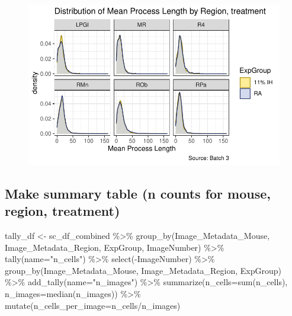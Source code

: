\documentclass[
  12pt,
  letterpaper,
  DIV=11,
  numbers=noendperiod]{scrartcl}
\newenvironment{Shaded}{\begin{snugshade}}{\end{snugshade}}
\newcommand{\AttributeTok}[1]{\textcolor[rgb]{0.40,0.45,0.13}{#1}}
\newcommand{\FunctionTok}[1]{\textcolor[rgb]{0.28,0.35,0.67}{#1}}
\newcommand{\NormalTok}[1]{\textcolor[rgb]{0.00,0.23,0.31}{#1}}
\newcommand{\OtherTok}[1]{\textcolor[rgb]{0.00,0.23,0.31}{#1}}
\newcommand{\SpecialCharTok}[1]{\textcolor[rgb]{0.37,0.37,0.37}{#1}}
\newcommand{\StringTok}[1]{\textcolor[rgb]{0.13,0.47,0.30}{#1}}
\begin{document}
\begin{figure}[H]

{\centering \includegraphics{Fiber_analysis_quarto_files/figure-pdf/make_distribution_plots_region-5.pdf}

}

\end{figure}

\hypertarget{make-summary-table-n-counts-for-mouse-region-treatment}{%
\subsection{Make summary table (n counts for mouse, region,
treatment)}\label{make-summary-table-n-counts-for-mouse-region-treatment}}

\begin{Shaded}
\begin{Highlighting}[]
\NormalTok{tally\_df }\OtherTok{\textless{}{-}}\NormalTok{ sc\_df\_combined }\SpecialCharTok{\%\textgreater{}\%} 
  \FunctionTok{group\_by}\NormalTok{(Image\_Metadata\_Mouse, Image\_Metadata\_Region, ExpGroup, ImageNumber) }\SpecialCharTok{\%\textgreater{}\%}
  \FunctionTok{tally}\NormalTok{(}\AttributeTok{name=}\StringTok{"n\_cells"}\NormalTok{) }\SpecialCharTok{\%\textgreater{}\%} 
  \FunctionTok{select}\NormalTok{(}\SpecialCharTok{{-}}\NormalTok{ImageNumber) }\SpecialCharTok{\%\textgreater{}\%} 
  \FunctionTok{group\_by}\NormalTok{(Image\_Metadata\_Mouse, Image\_Metadata\_Region, ExpGroup) }\SpecialCharTok{\%\textgreater{}\%} 
  \FunctionTok{add\_tally}\NormalTok{(}\AttributeTok{name=}\StringTok{"n\_images"}\NormalTok{) }\SpecialCharTok{\%\textgreater{}\%}
  \FunctionTok{summarize}\NormalTok{(}\AttributeTok{n\_cells=}\FunctionTok{sum}\NormalTok{(n\_cells), }\AttributeTok{n\_images=}\FunctionTok{median}\NormalTok{(n\_images)) }\SpecialCharTok{\%\textgreater{}\%}
  \FunctionTok{mutate}\NormalTok{(}\AttributeTok{n\_cells\_per\_image=}\NormalTok{n\_cells}\SpecialCharTok{/}\NormalTok{n\_images)}
\end{Highlighting}
\end{Shaded}
\end{document}
